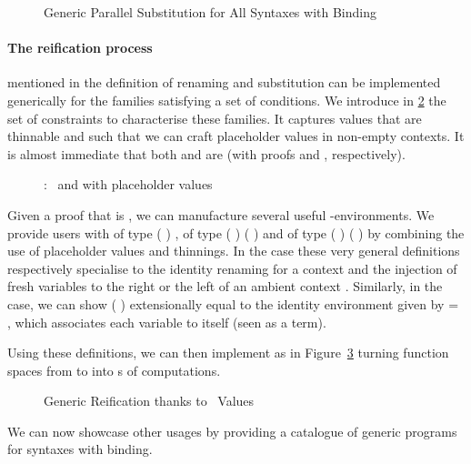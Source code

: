 \begin{figure}[h]
\caption{Generic Parallel Substitution for All Syntaxes with Binding\label{fig:gensub}}
\end{figure}

\paragraph{The reification process} mentioned in the definition of renaming
and substitution can be implemented generically for the \semrec{} families
satisfying a set of conditions.
%
We introduce in \cref{fig:VarLike} the  set of constraints
to characterise these families. It captures values that are thinnable and
such that we can craft placeholder values in non-empty contexts. It is
almost immediate that both  and  are  (with
proofs  and ,
respectively).

\begin{figure}[h]
\caption{: ~and with placeholder values\label{fig:VarLike}}
\end{figure}

\label{sec:varlike:base}
Given a proof that  is , we can manufacture
several useful -environments. We provide users with
 of type {( )  },
 of type
{( )  ( \AF{++} )}
and  of type
{( )  ( \AF{++} )}
by combining the use of placeholder values and thinnings.
%
In the  case these very general definitions respectively specialise
to the identity renaming for a context  and the injection of 
fresh variables to the right or the left of an ambient context .
%
Similarly, in the  case, we can show
{( )}
extensionally equal to the identity environment 
given by {  = },
which associates each variable to itself (seen as a term).

Using these definitions, we can then implement  as in
Figure~\ref{fig:kripkereify} turning  function spaces
from  to  into s of  computations.

\begin{figure}[h]
\caption{Generic Reification thanks to ~Values%
\label{fig:kripkereify}}
\end{figure}

We can now showcase other usages by providing a catalogue of generic programs
for syntaxes with binding.



